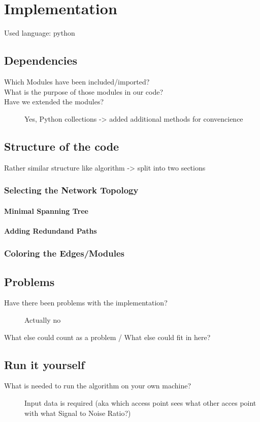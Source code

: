 \chapter{Implementation}
  Used language: python\newline
\section{Dependencies}
  \begin{description}
   \item[Which Modules have been included/imported?]
   \item[What is the purpose of those modules in our code?]
   \item[Have we extended the modules?]
   Yes, Python collections -> added additional methods for convencience
  \end{description}
\section{Structure of the code}
  Rather similar structure like algorithm -> split into two sections
  \subsection{Selecting the Network Topology}
    \subsubsection{Minimal Spanning Tree}
    \subsubsection{Adding Redundand Paths}
  \subsection{Coloring the Edges/Modules}
\section{Problems}
  \begin{description}
   \item[Have there been problems with the implementation?]
   Actually no
   \item[What else could count as a problem / What else could fit in here?]
  \end{description}
\section{Run it yourself}
  \begin{description}
   \item[What is needed to run the algorithm on your own machine?]
    Input data is required (aka which access point sees what other acces point with what Signal to Noise Ratio?) \newline
  \end{description}
